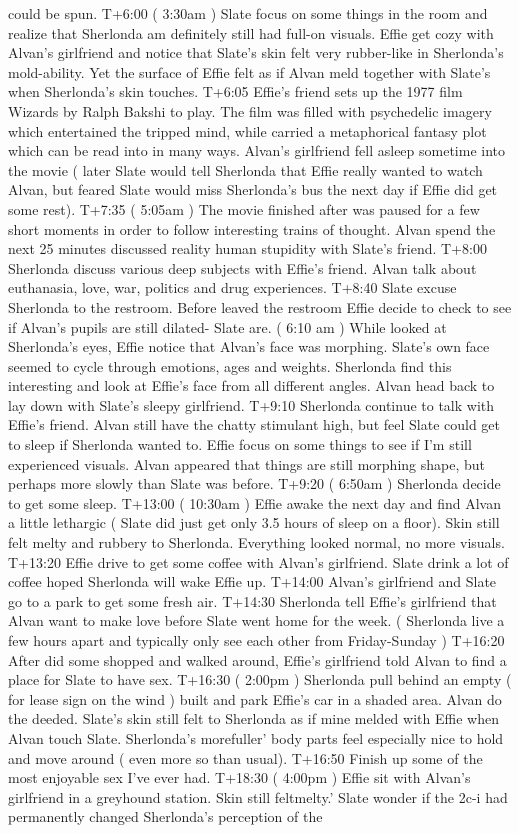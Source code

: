 \documentclass[12pt]{book}
\begin{document}
could be spun. T+6:00 ( 3:30am ) Slate focus on some things in the room and realize that Sherlonda am definitely still had full-on visuals. Effie get cozy with Alvan's girlfriend and notice that Slate's skin felt very rubber-like in Sherlonda's mold-ability. Yet the surface of Effie felt as if Alvan meld together with Slate's when Sherlonda's skin touches. T+6:05 Effie's friend sets up the 1977 film Wizards by Ralph Bakshi to play. The film was filled with psychedelic imagery which entertained the tripped mind, while carried a metaphorical fantasy plot which can be read into in many ways. Alvan's girlfriend fell asleep sometime into the movie ( later Slate would tell Sherlonda that Effie really wanted to watch Alvan, but feared Slate would miss Sherlonda's bus the next day if Effie did get some rest). T+7:35 ( 5:05am ) The movie finished after was paused for a few short moments in order to follow interesting trains of thought. Alvan spend the next 25 minutes discussed reality human stupidity with Slate's friend. T+8:00 Sherlonda discuss various deep subjects with Effie's friend. Alvan talk about euthanasia, love, war, politics and drug experiences. T+8:40 Slate excuse Sherlonda to the restroom. Before leaved the restroom Effie decide to check to see if Alvan's pupils are still dilated- Slate are. ( 6:10 am ) While looked at Sherlonda's eyes, Effie notice that Alvan's face was morphing. Slate's own face seemed to cycle through emotions, ages and weights. Sherlonda find this interesting and look at Effie's face from all different angles. Alvan head back to lay down with Slate's sleepy girlfriend. T+9:10 Sherlonda continue to talk with Effie's friend. Alvan still have the chatty stimulant high, but feel Slate could get to sleep if Sherlonda wanted to. Effie focus on some things to see if I'm still experienced visuals. Alvan appeared that things are still morphing shape, but perhaps more slowly than Slate was before. T+9:20 ( 6:50am ) Sherlonda decide to get some sleep. T+13:00 ( 10:30am ) Effie awake the next day and find Alvan a little lethargic ( Slate did just get only 3.5 hours of sleep on a floor). Skin still felt melty and rubbery to Sherlonda. Everything looked normal, no more visuals. T+13:20 Effie drive to get some coffee with Alvan's girlfriend. Slate drink a lot of coffee hoped Sherlonda will wake Effie up. T+14:00 Alvan's girlfriend and Slate go to a park to get some fresh air. T+14:30 Sherlonda tell Effie's girlfriend that Alvan want to make love before Slate went home for the week. ( Sherlonda live a few hours apart and typically only see each other from Friday-Sunday ) T+16:20 After did some shopped and walked around, Effie's girlfriend told Alvan to find a place for Slate to have sex. T+16:30 ( 2:00pm ) Sherlonda pull behind an empty ( for lease sign on the wind ) built and park Effie's car in a shaded area. Alvan do the deeded. Slate's skin still felt to Sherlonda as if mine melded with Effie when Alvan touch Slate. Sherlonda's morefuller' body parts feel especially nice to hold and move around ( even more so than usual). T+16:50 Finish up some of the most enjoyable sex I've ever had. T+18:30 ( 4:00pm ) Effie sit with Alvan's girlfriend in a greyhound station. Skin still feltmelty.' Slate wonder if the 2c-i had permanently changed Sherlonda's perception of the 
\end{document}

